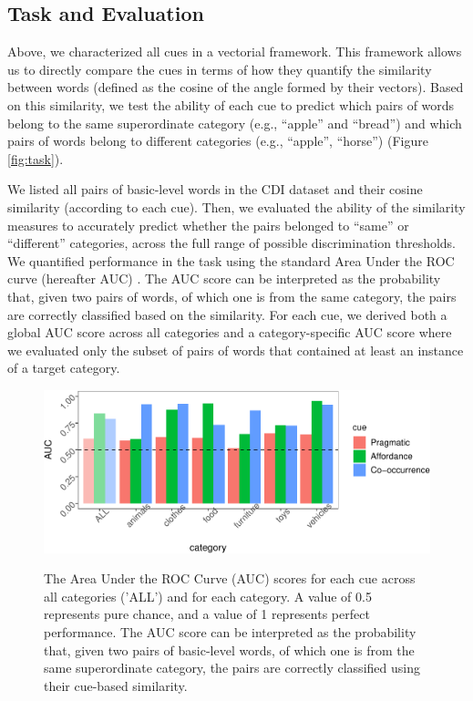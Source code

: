 \documentclass[10pt, letterpaper]{article}
\newenvironment{CodeChunk}{}{}
\begin{document}
\hypertarget{task-and-evaluation}{%
\subsection{Task and Evaluation}\label{task-and-evaluation}}

Above, we characterized all cues in a vectorial framework. This
framework allows us to directly compare the cues in terms of how they
quantify the similarity between words (defined as the cosine of the
angle formed by their vectors). Based on this similarity, we test the
ability of each cue to predict which pairs of words belong to the same
superordinate category (e.g., ``apple'' and ``bread'') and which pairs
of words belong to different categories (e.g., ``apple'', ``horse'')
(Figure \ref{fig:task}).

We listed all pairs of basic-level words in the CDI dataset and their cosine similarity (according to each cue).
Then, we evaluated the ability of the similarity measures to accurately
predict whether the pairs belonged to ``same'' or ``different''
categories, across the full range of possible discrimination thresholds.
We quantified performance in the task using the standard Area Under the ROC curve (hereafter AUC) \cite{fawcett2006}.
The AUC score can be interpreted as the probability that, given two pairs of words, of which one is from the
same category, the pairs are correctly classified based on the
similarity. For each cue, we derived both a global AUC score across all
categories and a category-specific AUC score where we evaluated only the
subset of pairs of words that contained at least an instance of a target
category.

\begin{CodeChunk}
\begin{figure}[h]

{\centering \includegraphics{cogsci_files/figure-latex/all_data-1}
}
\caption{\label{fig:data_all} The Area Under the ROC Curve (AUC) scores for each cue across all categories ('ALL') and for each category. A value of 0.5 represents pure chance, and a value of 1 represents perfect performance. The AUC score can be interpreted as the probability that, given two pairs of basic-level words, of which one is from the same superordinate category, the pairs are correctly classified using their  cue-based similarity.}
\end{figure}
\end{CodeChunk}
\end{document}
